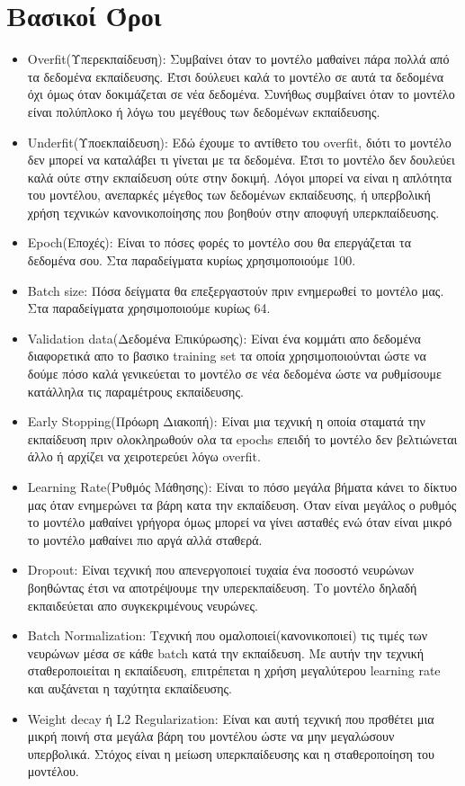 \documentclass[11pt, letterpaper]{article}
\begin{document}
\newpage

\section*{Βασικοί Όροι}
\begin{itemize}
    \item Overfit(Υπερεκπαίδευση): Συμβαίνει όταν το μοντέλο μαθαίνει πάρα πολλά από τα δεδομένα εκπαίδευσης. Έτσι δούλευει καλά το μοντέλο σε αυτά τα δεδομένα όχι όμως όταν δοκιμάζεται σε νέα δεδομένα. Συνήθως συμβαίνει όταν το μοντέλο είναι πολύπλοκο ή λόγω του μεγέθους των δεδομένων εκπαίδευσης.
    \item Underfit(Υποεκπαίδευση): Εδώ έχουμε το αντίθετο του overfit, διότι το μοντέλο δεν μπορεί να καταλάβει τι γίνεται με τα δεδομένα. Έτσι το μοντέλο δεν δουλεύει καλά ούτε στην εκπαίδευση ούτε στην δοκιμή. Λόγοι μπορεί να είναι η απλότητα του μοντέλου, ανεπαρκές μέγεθος των δεδομένων εκπαίδευσης, ή υπερβολική χρήση τεχνικών κανονικοποίησης που βοηθούν στην αποφυγή υπερκπαίδευσης.
    \item Epoch(Εποχές): Είναι το πόσες φορές το μοντέλο σου θα επεργάζεται τα δεδομένα σου. Στα παραδείγματα κυρίως χρησιμοποιούμε 100.
    \item Batch size: Πόσα δείγματα θα επεξεργαστούν πριν ενημερωθεί το μοντέλο μας. Στα παραδείγματα χρησιμοποιούμε κυρίως 64.
    \item Validation data(Δεδομένα Επικύρωσης): Είναι ένα κομμάτι απο δεδομένα διαφορετικά απο το βασικο training set τα οποία χρησιμοποιούνται ώστε να δούμε πόσο καλά γενικεύεται το μοντέλο σε νέα δεδομένα ώστε να ρυθμίσουμε κατάλληλα τις παραμέτρους εκπαίδευσης.
    \item Early Stopping(Πρόωρη Διακοπή): Είναι μια τεχνική η οποία σταματά την εκπαίδευση πριν ολοκληρωθούν ολα τα epochs επειδή το μοντέλο δεν βελτιώνεται άλλο ή αρχίζει να χειροτερεύει λόγω overfit.
    \item Learning Rate(Ρυθμός Μάθησης): Είναι το πόσο μεγάλα βήματα κάνει το δίκτυο μας όταν ενημερώνει τα βάρη κατα την εκπαίδευση. Όταν είναι μεγάλος ο ρυθμός το μοντέλο μαθαίνει γρήγορα όμως μπορεί να γίνει ασταθές ενώ όταν είναι μικρό το μοντέλο μαθαίνει πιο αργά αλλά σταθερά.
    \item Dropout: Είναι τεχνική που απενεργοποιεί τυχαία ένα ποσοστό νευρώνων βοηθώντας έτσι να αποτρέψουμε την υπερεκπαίδευση. Το μοντέλο δηλαδή  εκπαιδεύεται απο συγκεκριμένους νευρώνες.
    \item Batch Normalization: Τεχνική που ομαλοποιεί(κανονικοποιεί) τις τιμές των νευρώνων μέσα σε κάθε batch κατά την εκπαίδευση. Με αυτήν την τεχνική σταθεροποιείται η εκπαίδευση, επιτρέπεται η χρήση μεγαλύτερου learning rate και αυξάνεται η ταχύτητα εκπαίδευσης.
    \item Weight decay ή L2 Regularization: Είναι και αυτή τεχνική που πρσθέτει μια μικρή ποινή στα μεγάλα βάρη του μοντέλου ώστε να μην μεγαλώσουν υπερβολικά. Στόχος είναι η μείωση υπερκπαίδευσης και η σταθεροποίηση του μοντέλου. \\ \\
\end{itemize}
\end{document}
